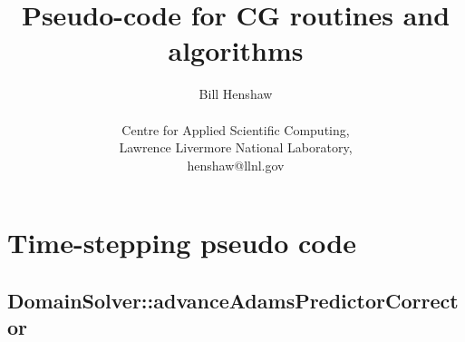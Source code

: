 \documentclass[11pt]{article}
\newcommand{\blue}{\color{blue}}
\newcommand{\red}{\color{red}}
\newcommand{\bfss}{\sffamily\bfseries}
\begin{document}
 
\title{Pseudo-code for CG routines and algorithms}

\author{
Bill Henshaw \\
\  \\
Centre for Applied Scientific Computing, \\
Lawrence Livermore National Laboratory, \\
henshaw@llnl.gov }
 
\maketitle

\tableofcontents

% 
\newcommand{\bc}[1]{\mbox{\bfss#1}}   %
\newcommand{\cc}[1]{\mbox{$//$  #1}}  %
%
\newcommand{\ia}{\quad}        %
\newcommand{\ib}{\ia\quad}     %
\newcommand{\ic}{\ib\quad}     %
\newcommand{\id}{\ic\quad}     %
\newcommand{\ie}{\id\quad}     %

\newcommand{\FUNC}[1]{{\blue#1}}
\newcommand{\IF}{{\blue if}}
\newcommand{\ELSEIF}{{\blue else if}}
\newcommand{\FOR}{{\blue for}}
\newcommand{\COM}[1]{{\red\em #1}}

\clearpage 
\section{Time-stepping pseudo code}

\subsection{DomainSolver::advanceAdamsPredictorCorrector}\label{sec:DomainSolver::advanceAdamsPredictorCorrector}
\end{document}
